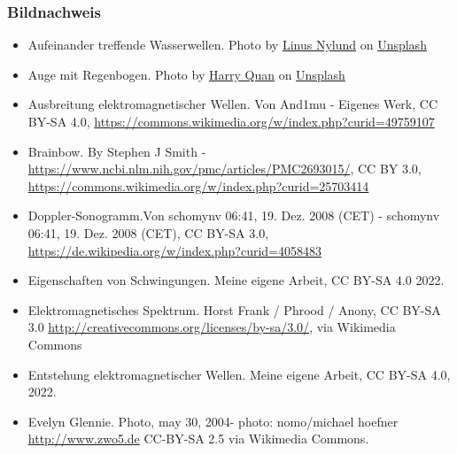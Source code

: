 \documentclass{beamer}
\begin{document}
\begin{frame}
\frametitle{Bildnachweis}

\vfill

\begin{tiny}
 
\begin{itemize}

\item
Aufeinander treffende Wasserwellen. Photo by \href{https://unsplash.com/@dreamsoftheoceans?utm_source=unsplash&utm_medium=referral&utm_content=creditCopyText}{Linus Nylund} on \href{https://unsplash.com/s/photos/water-ripples?utm_source=unsplash&utm_medium=referral&utm_content=creditCopyText}{Unsplash}
  
\item
Auge mit Regenbogen. Photo by \href{https://unsplash.com/@mango_quan?utm_source=unsplash&utm_medium=referral&utm_content=creditCopyText}{Harry Quan} on \href{https://unsplash.com/s/photos/prism?utm_source=unsplash&utm_medium=referral&utm_content=creditCopyText}{Unsplash}
  
\item
Ausbreitung elektromagnetischer Wellen. Von And1mu - Eigenes Werk, CC BY-SA 4.0, \url{https://commons.wikimedia.org/w/index.php?curid=49759107}

\item
Brainbow. By Stephen J Smith - \url{https://www.ncbi.nlm.nih.gov/pmc/articles/PMC2693015/}, CC BY 3.0, \url{https://commons.wikimedia.org/w/index.php?curid=25703414}

\item
Doppler-Sonogramm.Von schomynv 06:41, 19. Dez. 2008 (CET) - schomynv 06:41, 19. Dez. 2008 (CET), CC BY-SA 3.0, \url{https://de.wikipedia.org/w/index.php?curid=4058483}

\item
Eigenschaften von Schwingungen. Meine eigene Arbeit, CC BY-SA 4.0 2022.

\item
Elektromagnetisches Spektrum. Horst Frank / Phrood / Anony, CC BY-SA 3.0 \url{http://creativecommons.org/licenses/by-sa/3.0/}, via Wikimedia Commons

\item
Entstehung elektromagnetischer Wellen. Meine eigene Arbeit, CC BY-SA 4.0, 2022.

\item
Evelyn Glennie. Photo, may 30, 2004- photo: nomo/michael hoefner \url{http://www.zwo5.de} CC-BY-SA 2.5 via Wikimedia Commons.


\end{itemize}
\end{tiny}
\end{frame}
\end{document}
